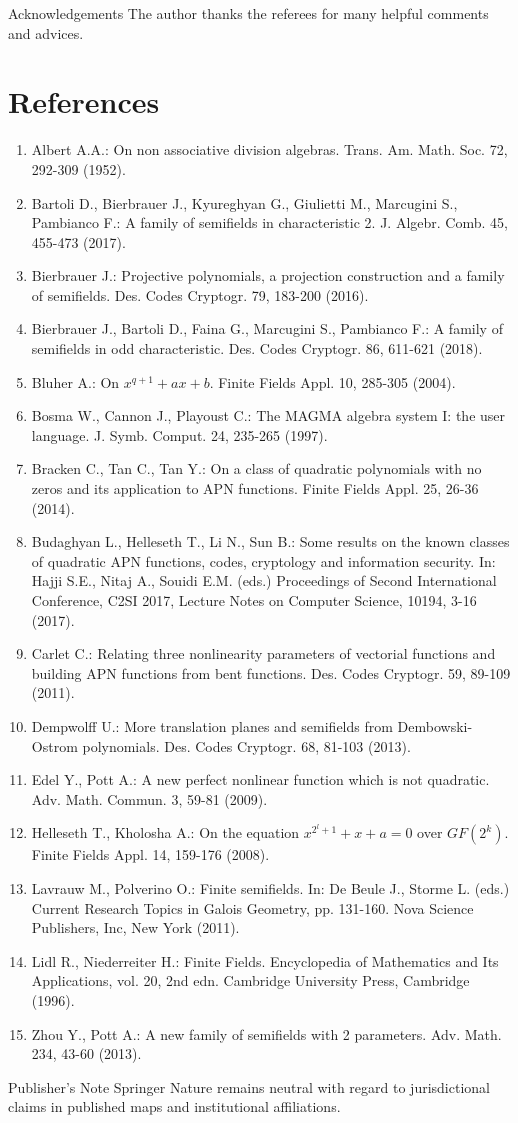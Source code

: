 \documentclass[10pt]{article}
\begin{document}
Acknowledgements The author thanks the referees for many helpful comments and advices.

\section*{References}
\begin{enumerate}
  \item Albert A.A.: On non associative division algebras. Trans. Am. Math. Soc. 72, 292-309 (1952).
  \item Bartoli D., Bierbrauer J., Kyureghyan G., Giulietti M., Marcugini S., Pambianco F.: A family of semifields in characteristic 2. J. Algebr. Comb. 45, 455-473 (2017).
  \item Bierbrauer J.: Projective polynomials, a projection construction and a family of semifields. Des. Codes Cryptogr. 79, 183-200 (2016).
  \item Bierbrauer J., Bartoli D., Faina G., Marcugini S., Pambianco F.: A family of semifields in odd characteristic. Des. Codes Cryptogr. 86, 611-621 (2018).
  \item Bluher A.: On $x^{q+1}+a x+b$. Finite Fields Appl. 10, 285-305 (2004).
  \item Bosma W., Cannon J., Playoust C.: The MAGMA algebra system I: the user language. J. Symb. Comput. 24, 235-265 (1997).
  \item Bracken C., Tan C., Tan Y.: On a class of quadratic polynomials with no zeros and its application to APN functions. Finite Fields Appl. 25, 26-36 (2014).
  \item Budaghyan L., Helleseth T., Li N., Sun B.: Some results on the known classes of quadratic APN functions, codes, cryptology and information security. In: Hajji S.E., Nitaj A., Souidi E.M. (eds.) Proceedings of Second International Conference, C2SI 2017, Lecture Notes on Computer Science, 10194, 3-16 (2017).
  \item Carlet C.: Relating three nonlinearity parameters of vectorial functions and building APN functions from bent functions. Des. Codes Cryptogr. 59, 89-109 (2011).
  \item Dempwolff U.: More translation planes and semifields from Dembowski-Ostrom polynomials. Des. Codes Cryptogr. 68, 81-103 (2013).
  \item Edel Y., Pott A.: A new perfect nonlinear function which is not quadratic. Adv. Math. Commun. 3, 59-81 (2009).
  \item Helleseth T., Kholosha A.: On the equation $x^{2^{l}+1}+x+a=0$ over $G F\left(2^{k}\right)$. Finite Fields Appl. 14, 159-176 (2008).
  \item Lavrauw M., Polverino O.: Finite semifields. In: De Beule J., Storme L. (eds.) Current Research Topics in Galois Geometry, pp. 131-160. Nova Science Publishers, Inc, New York (2011).
  \item Lidl R., Niederreiter H.: Finite Fields. Encyclopedia of Mathematics and Its Applications, vol. 20, 2nd edn. Cambridge University Press, Cambridge (1996).
  \item Zhou Y., Pott A.: A new family of semifields with 2 parameters. Adv. Math. 234, 43-60 (2013).
\end{enumerate}

Publisher's Note Springer Nature remains neutral with regard to jurisdictional claims in published maps and institutional affiliations.
\end{document}
